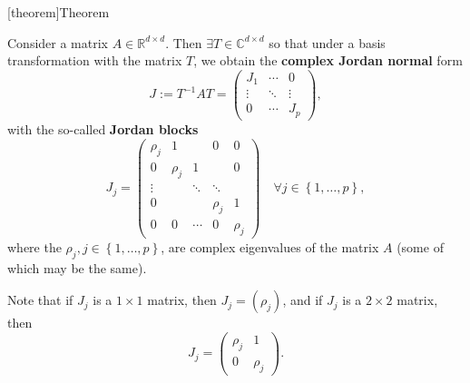 \documentclass[12pt]{report}
\theoremstyle{definition}
\begin{document}
[theorem]{Theorem}
\begin{Complex Jordan normal form}\label{complex Jordan normal form}
    Consider a matrix $A\in\mathbb{R}^{d\times d}$.
    Then $\exists T\in\mathbb{C}^{d\times d}$ so that under a basis
    transformation with the matrix $T$, we obtain the 
    \textbf{complex Jordan normal} form
    \[
        J:=T^{-1}AT=
        \begin{pmatrix}
            J_1 & \cdots & 0 \\
            \vdots & \ddots & \vdots \\
            0 & \cdots & J_p
        \end{pmatrix},
    \]
    with the so-called \textbf{Jordan blocks}
    \begin{equation}\label{eq:complexJBlocks}
        J_j=\begin{pmatrix}
            \rho_j & 1 &   & 0 & 0 \\
            0 & \rho_j & 1 &   & 0 \\
            \vdots &   & \ddots & \ddots &  \\
            0 &   &   & \rho_j & 1 \\
            0 & 0 & \cdots & 0 & \rho_j
        \end{pmatrix} 
        \quad\forall j\in\left\{1,\ldots,p\right\},
    \end{equation} 
    where the $\rho_j,j\in\left\{1,\ldots,p\right\}$, are complex eigenvalues of
    the matrix $A$ (some of which may be the same).
\end{Complex Jordan normal form}
Note that if $J_j$ is a $1\times 1$ matrix, then $J_j=(\rho_j)$, and if $J_j$ is
a $2\times 2$ matrix, then
\[
    J_j=
    \begin{pmatrix}
        \rho_j & 1 \\
        0 & \rho_j
    \end{pmatrix}.
\]
\end{document}
